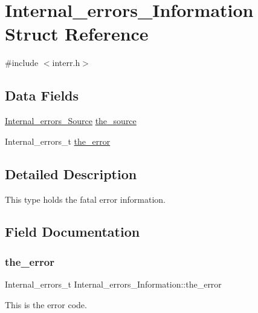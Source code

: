 \hypertarget{structInternal__errors__Information}{}\section{Internal\+\_\+errors\+\_\+\+Information Struct Reference}
\label{structInternal__errors__Information}


{\ttfamily \#include $<$interr.\+h$>$}

\subsection*{Data Fields}
\begin{DoxyCompactItemize}
\item 
\mbox{\hyperlink{group__RTEMSScoreIntErr_ga878b4de77df7d0b83d19609d4de42c26}{Internal\+\_\+errors\+\_\+\+Source}} \mbox{\hyperlink{structInternal__errors__Information_a0459924f8315b09dc78d73a72685a2f6}{the\+\_\+source}}
\item 
Internal\+\_\+errors\+\_\+t \mbox{\hyperlink{structInternal__errors__Information_a9fd5c74c962a039e196e6b0b1313049c}{the\+\_\+error}}
\end{DoxyCompactItemize}


\subsection{Detailed Description}
This type holds the fatal error information. 

\subsection{Field Documentation}
\mbox{\label{structInternal__errors__Information_a9fd5c74c962a039e196e6b0b1313049c}} 
\subsubsection{\texorpdfstring{the\_error}{the\_error}}
{\footnotesize\ttfamily Internal\+\_\+errors\+\_\+t Internal\+\_\+errors\+\_\+\+Information\+::the\+\_\+error}

This is the error code. \mbox{\label{structInternal__errors__Information_a0459924f8315b09dc78d73a72685a2f6}} 
